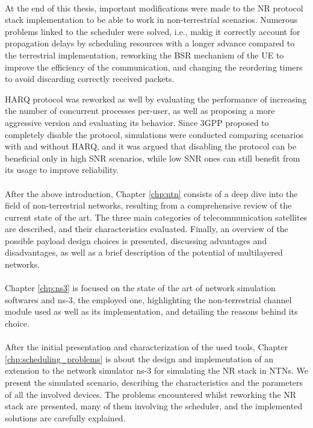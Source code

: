 \paragraph{}
At the end of this thesis, important modifications were made to the \ac{NR} protocol stack implementation to be able to work in non-terrestrial scenarios. Numerous problems linked to the scheduler were solved, i.e., makig it correctly account for propagation delays by scheduling resources with a longer sdvance compared to the terrestrial implementation, reworking the \ac{BSR} mechanism of the \ac{UE} to improve the efficiency of the communication, and changing the reordering timers to avoid discarding correctly received packets. 

\ac{HARQ} protocol was reworked as well by evaluating the performance of increasing the number of concurrent processes per-user, as well as proposing a more aggressive version and evaluating its behavior. Since \ac{3GPP} proposed to completely disable the protocol, simulations were conducted comparing scenarios with and without \ac{HARQ}, and it was argued that disabling the protocol can be beneficial only in high SNR scenarios, while low SNR ones can still benefit from its usage to improve reliability.

\paragraph{}
After the above introduction, Chapter \ref{chp:ntn} consists of a deep dive into the field of non-terrestrial networks, resulting from a comprehensive review of the current state of the art. The three main categories of telecommunication satellites are described, and their characteristics evaluated. Finally, an overview of the possible payload design choices is presented, discussing advantages and disadvantages, as well as a brief description of the potential of multilayered networks.

\paragraph{}
Chapter \ref{chp:ns3} is focused on the state of the art of network simulation softwares and ns-3, the employed one, highlighting the non-terrestrial channel module used as well as its implementation, and detailing the reasons behind its choice. 

\paragraph{}
After the initial presentation and characterization of the used tools, Chapter \ref{chp:scheduling_problems} is about the design and implementation of an extension to the network simulator ns-3 for simulating the \ac{NR} stack in \acp{NTN}. We present the simulated scenario, describing the characteristics and the parameters of all the involved devices.
The problems encountered whilst reworking the \ac{NR} stack are presented, many of them involving the scheduler, and the implemented solutions are carefully explained. 


